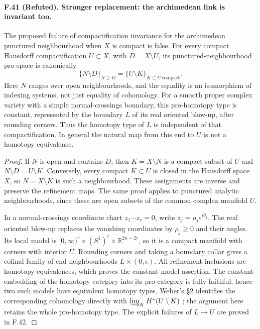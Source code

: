 \paragraph{F.41 (Refuted). Stronger replacement: the archimedean link is invariant too.}
The proposed failure of compactification invariance for the archimedean
punctured neighbourhood when $X$ is compact is false. For every compact
Hausdorff compactification $U\subset X$, with $D=X\setminus U$, its
punctured-neighbourhood pro-space is canonically
\[
 \{N\setminus D\}_{N\supset D}
       =\{U\setminus K\}_{K\subset U\ \mathrm{compact}}.
\]
Here $N$ ranges over open neighbourhoods, and the equality is an
isomorphism of indexing systems, not just equality of cohomology.
For a smooth proper complex variety with a simple normal-crossings
boundary, this pro-homotopy type is constant, represented by the boundary
$L$ of its real oriented blow-up, after rounding corners. Thus the
homotopy type of $L$ is independent of that compactification. In general
the natural map from this end to $U$ is not a homotopy equivalence.

\begin{proof}
If $N$ is open and contains $D$, then $K=X\setminus N$ is a compact
subset of $U$ and $N\setminus D=U\setminus K$. Conversely, every compact
$K\subset U$ is closed in the Hausdorff space $X$, so $N=X\setminus K$
is such a neighbourhood. These assignments are inverse and preserve the
refinement maps. The same proof applies to punctured analytic
neighbourhoods, since these are open subsets of the common complex
manifold $U$.

In a normal-crossings coordinate chart $z_1\cdots z_r=0$, write
$z_j=\rho_j e^{i\theta_j}$. The real oriented blow-up replaces the
vanishing coordinates by $\rho_j\geq0$ and their angles. Its local model
is $[0,\infty)^r\times(S^1)^r\times\mathbb R^{2n-2r}$, so it is a
compact manifold with corners with interior $U$. Rounding corners and
taking a boundary collar gives a cofinal family of end neighbourhoods
$L\times(0,\epsilon)$. All refinement inclusions are homotopy
equivalences, which proves the constant-model assertion. The constant
embedding of the homotopy category into its pro-category is fully
faithful; hence two such models have equivalent homotopy types. Weber's
\S2 identifies the corresponding cohomology directly with
$\varinjlim_K H^*(U\setminus K)$ \cite{Weber2012}; the argument here
retains the whole pro-homotopy type. The explicit failures of $L\to U$
are proved in F.42.
\end{proof}


